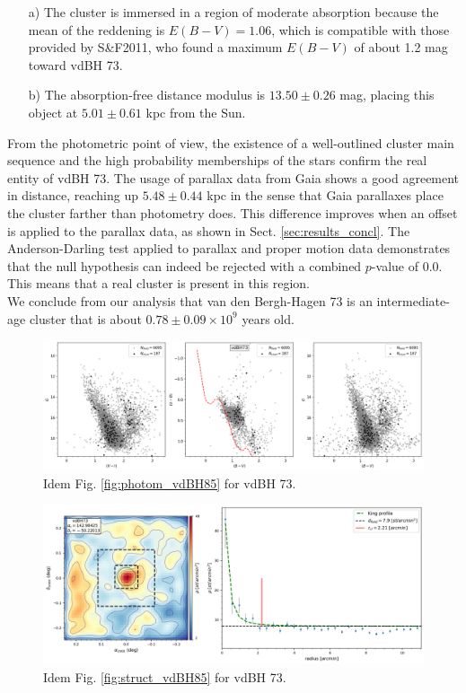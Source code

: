 \documentclass[draft]{aa}
\begin{document}
\begin{itemize}
\item [a)] The cluster is immersed in a region of moderate absorption
because the mean of the reddening is $E(B-V)=1.06$, which is compatible
with those provided by S\&F2011, who found a maximum $E(B-V)$ of about 1.2 mag
toward vdBH 73.
\item [b)] The absorption-free distance modulus is
$13.50\pm0.26$ mag, placing this object at $5.01\pm0.61$ kpc from the Sun.
\end{itemize}

From the photometric point of view, the existence of a well-outlined cluster main
sequence and the high probability memberships of the stars confirm
the real entity of vdBH 73.
The usage of parallax data from Gaia shows a good agreement in distance,
reaching up $5.48\pm0.44$ kpc in the sense that Gaia parallaxes place the
cluster farther than photometry does. This difference improves when an offset is
applied to the parallax data, as shown in Sect. \ref{sec:results_concl}.
The Anderson-Darling test applied to parallax and proper motion data
demonstrates that the null hypothesis can indeed be rejected with a
combined $p$-value of 0.0. This means that a real cluster is present in this
region.\\

We conclude from our analysis that van den Bergh-Hagen 73 is an intermediate-age cluster that is about $0.78\pm0.09\times10^9$ years old.


\begin{figure}[ht]
    \centering
    \includegraphics[width=\hsize]{../figs/obs_vdBH73.png}
\caption{Idem Fig. \ref{fig:photom_vdBH85} for vdBH 73.}
    \label{fig:photom_vdBH73}
\end{figure}

\begin{figure}[ht]
    \centering
    \includegraphics[width=\hsize]{../figs/dmap_vdbh73.png}
\caption{Idem Fig. \ref{fig:struct_vdBH85} for vdBH 73.}
    \label{fig:struct_vdBH73}
\end{figure}
\end{document}
